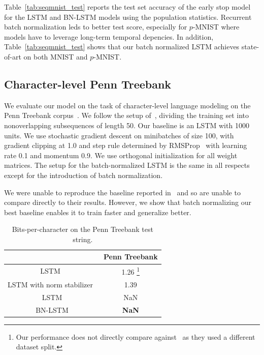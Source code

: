 \documentclass{article} %
\begin{document}
Table~\ref{tab:seqmnist_test} reports the test set accuracy of the early stop model for the LSTM and BN-LSTM models using the population statistics. Recurrent batch normalization leds to better test score, especially for $p$-MNIST  where models have to leverage long-term temporal depencies. In addition, Table~\ref{tab:seqmnist_test} shows that our batch normalized LSTM achieves state-of-art on both MNIST and $p$-MNIST.

\subsection{Character-level Penn Treebank}

We evaluate our model on the task of character-level language modeling on the Penn Treebank corpus~\cite{penntreebank}.
We follow the setup of~\cite{krueger}, dividing the training set into nonoverlapping subsequences of length 50.
Our baseline is an LSTM with 1000 units.
We use stochastic gradient descent on minibatches of size 100,
with gradient clipping at 1.0 and step rule determined by RMSProp~\cite{rmsprop}
with learning rate 0.1 and momentum 0.9.
We use orthogonal initialization for all weight matrices.
The setup for the batch-normalized LSTM is the same in all respects except for the introduction of batch normalization.


We were unable to reproduce the baseline reported in~\cite{krueger} and so are unable to compare directly to their results.
However, we show that batch normalizing our best baseline enables it to train faster and generalize better.


\begin{table}
\center
\begin{tabular}{c|c}
  & Penn Treebank \\
  \hline
  LSTM~\cite{graves2013generating} & 1.26
\footnote{Our performance does not directly compare against~\cite{graves2013generating} as they used a different dataset split.}
\\
  LSTM with norm stabilizer~\cite{krueger} & 1.39 \\
  \hline
  LSTM & NaN \\
  BN-LSTM & \textbf{NaN} \\
\end{tabular}
\caption{Bits-per-character on the Penn Treebank test string.}
\label{tab:ptb_test}
\end{table}
\end{document}
